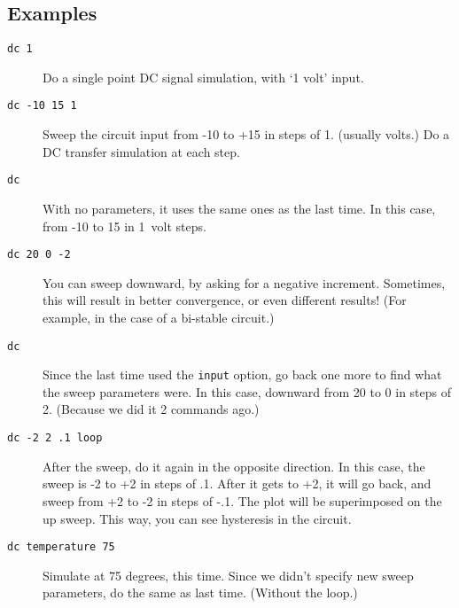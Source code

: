 \subsection{Examples}

\begin{description}

\item[{\tt dc 1}] Do a single point DC signal simulation, with {`1 volt'}
input.

\item[{\tt dc -10 15 1}] Sweep the circuit input from -10 to +15 in steps of
1.  (usually volts.)  Do a DC transfer simulation at each step.

\item[{\tt dc}] With no parameters, it uses the same ones as the last time.
In this case, from -10 to 15 in 1\ volt steps.

\item[{\tt dc 20 0 -2}] You can sweep downward, by asking for a negative
increment.  Sometimes, this will result in better convergence, or even
different results!  (For example, in the case of a bi-stable circuit.)

\item[{\tt dc}] Since the last time used the {\tt input} option, go back one
more to find what the sweep parameters were.  In this case, downward from 20
to 0 in steps of 2.  (Because we did it 2 commands ago.)

\item[{\tt dc -2 2 .1 loop}] After the sweep, do it again in the opposite
direction.  In this case, the sweep is -2 to +2 in steps of .1.  After it
gets to +2, it will go back, and sweep from +2 to -2 in steps of -.1.  The
plot will be superimposed on the up sweep.  This way, you can see hysteresis
in the circuit.

\item[{\tt dc temperature 75}] Simulate at 75 degrees, this time.  Since we
didn't specify new sweep parameters, do the same as last time.  (Without the
loop.)


\end{description}
